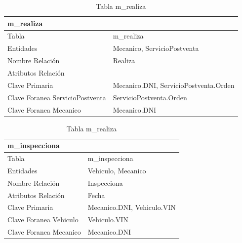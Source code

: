 \documentclass[12pt]{article}
\begin{document}
\begin{table}[h]
    \begin{center}
        \begin{tabular}{|l|l|}
            \multicolumn{2}{l}{\textbf{m\_realiza}} \\
            \hline
            Tabla & m\_realiza \\ \hline        
            Entidades & Mecanico, ServicioPostventa \\ \hline
            Nombre Relación & Realiza \\ \hline
            Atributos Relación &  \\ \hline
            Clave Primaria & Mecanico.DNI, ServicioPostventa.Orden \\ \hline
            Clave Foranea ServicioPostventa & ServicioPostventa.Orden \\ \hline
            Clave Foranea Mecanico & Mecanico.DNI \\
            \hline
            \end{tabular}
        \caption{Tabla m\_realiza}
        \label{tab:tablas}
    \end{center}
\end{table}

\begin{table}[h]
    \begin{center}
        \begin{tabular}{|l|l|}
            \multicolumn{2}{l}{\textbf{m\_inspecciona}} \\
            \hline
            Tabla & m\_inspecciona \\ \hline        
            Entidades & Vehiculo, Mecanico \\ \hline
            Nombre Relación & Inspecciona \\ \hline
            Atributos Relación & Fecha \\ \hline
            Clave Primaria & Mecanico.DNI, Vehiculo.VIN \\ \hline
            Clave Foranea Vehiculo & Vehiculo.VIN \\ \hline
            Clave Foranea Mecanico & Mecanico.DNI \\
            \hline
            \end{tabular}
        \caption{Tabla m\_realiza}
        \label{tab:tablas}
    \end{center}
\end{table}
\end{document}
